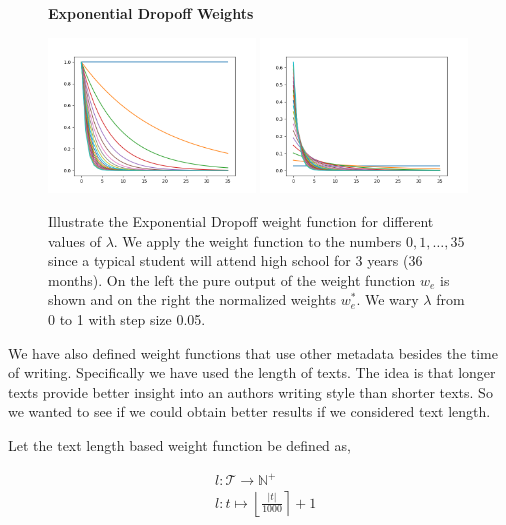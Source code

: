 \begin{figure}
    \centering
    \textbf{Exponential Dropoff Weights}\par\medskip
    \includegraphics[width=0.49\textwidth]{./pictures/method/weights.png}
    \includegraphics[width=0.49\textwidth]{./pictures/method/weights_normalized.png}
    \caption{Illustrate the Exponential Dropoff weight function for different
        values of $\lambda$. We apply the weight function to the numbers $0, 1,
        \dots, 35$ since a typical student will attend high school for 3 years
        (36 months). On the left the pure output of the weight function $w_e$ is
        shown and on the right the normalized weights $w_e^*$. We wary $\lambda$
        from 0 to 1 with step size 0.05.}
    \label{fig:weights}
\end{figure}

We have also defined weight functions that use other metadata besides the time
of writing. Specifically we have used the length of texts. The idea is that
longer texts provide better insight into an authors writing style than shorter
texts. So we wanted to see if we could obtain better results if we considered
text length.

\begin{definition}

    Let the text length based weight function be defined as,

    \begin{align}
        &l \colon \mathcal{T} \rightarrow \mathbb{N}^+ \\
        &l \colon t \mapsto \left\lfloor \frac{|t|}{1000} \right\rceil + 1
    \end{align}

\end{definition}

